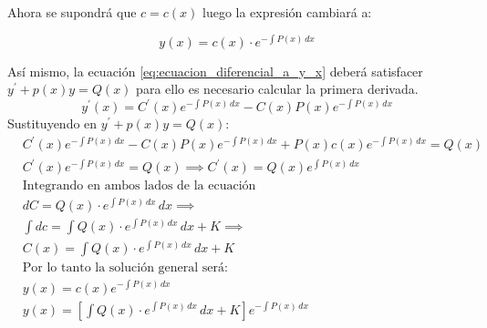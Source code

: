 Ahora se supondrá que $c=c(x)$ luego la expresión cambiará a:

\begin{equation}
    y(x)=c(x)\cdot e^{-\int P(x)\, dx}
    \label{eq:ecuacion_diferencial_a_y_x}
\end{equation}

Así mismo, la ecuación \eqref{eq:ecuacion_diferencial_a_y_x}
deberá satisfacer $y^{\prime}+p(x)y=Q(x)$ para ello es necesario calcular la primera derivada.
\begin{equation*}
    y^{\prime}(x)=C^{\prime}(x)e^{-\int P(x)\,dx}-C(x)P(x)e^{-\int P(x)\,dx}
\end{equation*}
Sustituyendo en $y^{\prime}+p(x)y=Q(x)$:
\begin{align*}
    &C^{\prime}(x)e^{-\int P(x)\,dx}-C(x)P(x)e^{-\int P(x)\,dx}+P(x)c(x)e^{-\int P(x)\,dx}=Q(x)\\
    &C^{\prime}(x)e^{-\int P(x)\,dx}=Q{(x)}\implies C^{\prime}(x)=Q(x)e^{\int P(x)\,dx}\\
    &\text{Integrando en ambos lados de la ecuación}\\
    &dC=Q(x)\cdot e^{\int P(x)\, dx}\, dx\implies\\
    &\int dc=\int Q(x)\cdot e^{\int P(x)\, dx}\, dx+K\implies\\
    &C(x)=\int Q(x)\cdot e^{\int P(x)\, dx}\, dx+K\\
    &\text{Por lo tanto la solución general será:}\\
    &y(x)=c(x)e^{-\int P(x)\, dx}\\
    &y(x)=\left[\int Q(x)\cdot e^{\int P(x)\, dx}\, dx+K\right]e^{-\int P(x)\, dx}
\end{align*}

